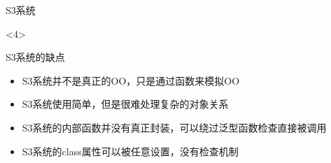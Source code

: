 \begin{frame}[t,fragile]{\subsecname}{S3系统}
\begin{overlayarea}{\textwidth}{0.5\textheight}
\begin{onlyenv}<4>
\begin{badbox}{S3系统的缺点}
\begin{itemize}
\item[\PencilLeftDown] S3系统并不是真正的OO，只是通过函数来模拟OO
\item[\PencilLeftDown] S3系统使用简单，但是很难处理复杂的对象关系
\item[\PencilLeftDown] S3系统的内部函数并没有真正封装，可以绕过泛型函数检查直接被调用
\item[\PencilLeftDown] S3系统的class属性可以被任意设置，没有检查机制
\end{itemize}
\end{badbox}
\end{onlyenv}
\end{overlayarea}
\end{frame}

